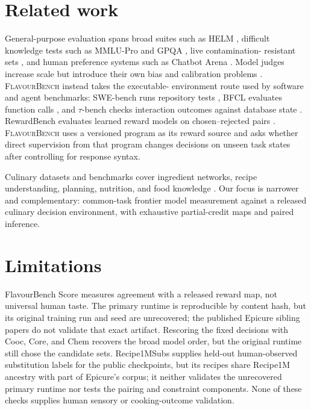\documentclass[10pt,twocolumn]{article}
\newcommand{\system}{\textsc{FlavourBench}}
\begin{document}
\section{Related work}

General-purpose evaluation spans broad suites such as HELM \cite{liang2022helm}, difficult
knowledge tests such as MMLU-Pro and GPQA \cite{wang2024mmlupro,rein2023gpqa}, live contamination-
resistant sets \cite{white2024livebench,jain2024livecodebench}, and human preference systems such
as Chatbot Arena \cite{chiang2024chatbotarena}. Model judges increase scale but introduce their own
bias and calibration problems \cite{zheng2023judging}. \system{} instead takes the executable-
environment route used by software and agent benchmarks: SWE-bench runs repository tests
\cite{jimenez2023swebench}, BFCL evaluates function calls \cite{patil2025bfcl}, and $\tau$-bench
checks interaction outcomes against database state \cite{yao2024taubench}.
RewardBench evaluates learned reward models on chosen--rejected pairs
\cite{lambert2024rewardbench}. \system{} uses a versioned program as its reward source and asks
whether direct supervision from that program changes decisions on unseen task states after
controlling for response syntax.

Culinary datasets and benchmarks cover ingredient networks, recipe understanding, planning,
nutrition, and food knowledge \cite{ahn2011flavor,garg2018flavordb,salvador2017recipe1m,
fatemi2023substitute,choi2024cookingsense,wu2025recipe2plan,hua2025nutribench,
eftimov2026foodbench,jin2026diningbench}.
Our focus is narrower and complementary: common-task frontier model measurement against a
released culinary decision environment, with exhaustive partial-credit maps and paired inference.

\section{Limitations}

FlavourBench Score measures agreement with a released reward map, not universal human taste. The
primary runtime is reproducible by content hash, but its original training run and seed are
unrecovered; the published Epicure sibling papers do not validate that exact artifact. Rescoring
the fixed decisions with Cooc, Core, and Chem recovers the broad model order, but the original
runtime still chose the candidate sets. Recipe1MSubs supplies held-out human-observed substitution
labels for the public checkpoints, but its recipes share Recipe1M ancestry with part of Epicure's
corpus; it neither validates the unrecovered primary runtime nor tests the pairing and constraint
components. None of these checks supplies human sensory or cooking-outcome validation.
\end{document}
